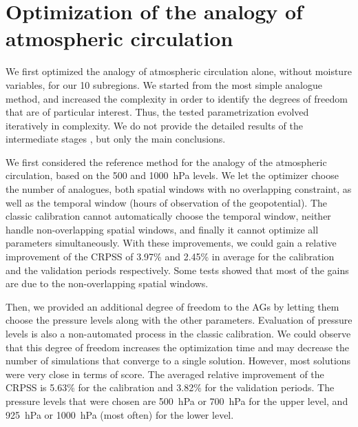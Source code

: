 \documentclass[twocol]{ametsoc}
\begin{document}
\section{Optimization of the analogy of atmospheric circulation}

We first optimized the analogy of atmospheric circulation alone, without moisture variables, for our 10 subregions. We started from the most simple analogue method, and increased the complexity in order to identify the degrees of freedom that are of particular interest. Thus, the tested parametrization evolved iteratively in complexity. We do not provide the detailed results of the intermediate stages \citep[see][for the details]{Horton2012a}, but only the main conclusions.

We first considered the reference method for the analogy of the atmospheric circulation, based on the 500 and 1000~hPa levels. We let the optimizer choose the number of analogues, both spatial windows with no overlapping constraint, as well as the temporal window (hours of observation of the geopotential). The classic calibration cannot automatically choose the temporal window, neither handle non-overlapping spatial windows, and finally it cannot optimize all parameters simultaneously. With these improvements, we could gain a relative improvement of the CRPSS of 3.97\% and 2.45\% in average for the calibration and the validation periods respectively. Some tests showed that most of the gains are due to the non-overlapping spatial windows.

Then, we provided an additional degree of freedom to the AGs by letting them choose the pressure levels along with the other parameters. Evaluation of pressure levels is also a non-automated process in the classic calibration. We could observe that this degree of freedom increases the optimization time and may decrease the number of simulations that converge to a single solution. However, most solutions were very close in terms of score. The averaged relative improvement of the CRPSS is 5.63\% for the calibration and 3.82\% for the validation periods. The pressure levels that were chosen are 500~hPa or 700~hPa for the upper level, and 925~hPa or 1000~hPa (most often) for the lower level.
\end{document}

